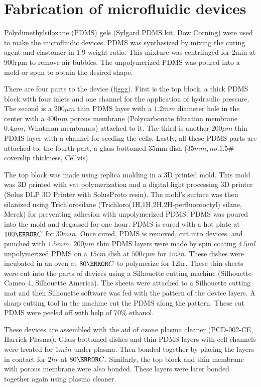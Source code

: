 \section{Fabrication of microfluidic devices}
 
Polydimethylsiloxane (PDMS) gels (Sylgard PDMS kit, Dow Corning) were used to make the microfluidic devices. PDMS was synthesized by mixing the curing agent and elastomer in 1:9 weight ratio. This mixture was centrifuged for 2min at 900rpm to remove air bubbles. The unpolymerized PDMS was poured into a mold or spun to obtain the desired shape. 

There are four parts to the device (figgg). First is the top block, a thick PDMS block with four inlets and one channel for the application of hydraulic pressure. The second is a $200 \mu m$ thin PDMS layer with a $1.2mm$ diameter hole in the center with a $400nm$ porous membrane (Polycarbonate filtration membrane $0.4\mu m$, Whatman membranes) attached to it. The third is another $200 \mu m$ thin PDMS layer with a channel for seeding the cells. Lastly, all these PDMS parts are attached to, the fourth part, a glass-bottomed 35mm dish ($35mm, no. 1.5\#$ coverslip thickness, Cellvis). 

The top block was made using replica molding in a 3D printed mold. This mold was 3D printed with vat polymerization and a digital light processing 3D printer (Solus DLP 3D Printer with SolusProto resin). The mold’s surface was then silanized using Trichlorosilane (Trichloro(1H,1H,2H,2H-perfluorooctyl) silane, Merck) for preventing adhesion with unpolymerized PDMS. PDMS was poured into the mold and degassed for one hour. PDMS is cured with a hot plate at $100\degree C$ for $30min$. Once cured, PDMS is removed, cut into devices, and punched with $1.5mm$. $200\mu m$ thin PDMS layers were made by spin coating $4.5ml$ unpolymerized PDMS on a $15cm$ dish at $500rpm$ for $1min$. These dishes were incubated in an oven at $80\degree C$ to polymerize for 12hr. These thin sheets were cut into the parts of devices using a Silhouette cutting machine (Silhouette Cameo 4, Silhouette America). The sheets were attached to a Silhouette cutting mat and then Silhouette software was fed with the pattern of the device layers. A sharp cutting tool in the machine cut the PDMS along the pattern. These cut PDMS were peeled off with help of $70\%$ ethanol. 

These devices are assembled with the aid of ozone plasma cleaner (PCD-002-CE, Harrick Plasma). Glass bottomed dishes and thin PDMS layers with cell channels were treated for $1 min$ under plasma. Then bonded together by placing the layers in contact for $2 hr$ at $80 \degree C$. Similarly, the top block and thin membrane with porous membrane were also bonded. These layers were later bonded together again using plasma cleaner.

